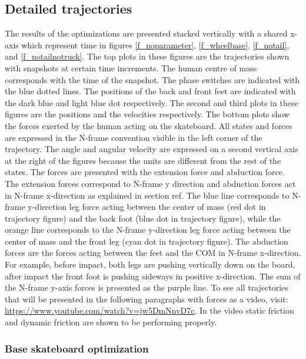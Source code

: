 \subsection{Detailed trajectories}
\noindent The results of the optimizations are presented stacked vertically with a shared x-axis which represent time in figures \ref{f_noparameter}, \ref{f_wheelbase}, \ref{f_notail}, and \ref{f_notailnotruck}. The top plots in these figures are the trajectories shown with snapshots at certain time increments. The human centre of mass corresponds with the time of the snapshot. The phase switches are indicated with the blue dotted lines. The positions of the back and front feet are indicated with the dark blue and light blue dot respectively. The second and third plots in these figures are the positions and the velocities respectively. The bottom plots show the forces exerted by the human acting on the skateboard. All states and forces are expressed in the N-frame convention visible in the left corner of the trajectory. The angle and angular velocity are expressed on a second vertical axis at the right of the figures because the units are different from the rest of the states. The forces are presented with the extension force and abduction force. The extension forces correspond to N-frame y direction and abduction forces act in N-frame x-direction as explained in section ref{}. The blue line corresponds to N-frame y-direction leg force acting between the center of mass (red dot in trajectory figure) and the back foot (blue dot in trajectory figure), while the orange line corresponds to the N-frame y-direction leg force acting between the center of mass and the front leg (cyan dot in trajectory figure). The abduction forces are the forces acting between the feet and the COM in N-frame x-direction. For example, before impact, both legs are pushing vertically down on the board, after impact the front foot is pushing sideways in positive x-direction. The sum of the N-frame y-axis forces is presented as the purple line. To see all trajectories that will be presented in the following paragraphs with forces as a video, visit: \url{https://www.youtube.com/watch?v=jw5DmNnvD7c}. In the video static friction and dynamic friction are shown to be performing properly.


\subsubsection{Base skateboard optimization}


